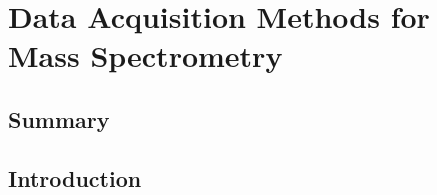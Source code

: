 \chapter{Data Acquisition Methods for Mass Spectrometry}

\section{Summary}

\section{Introduction}

